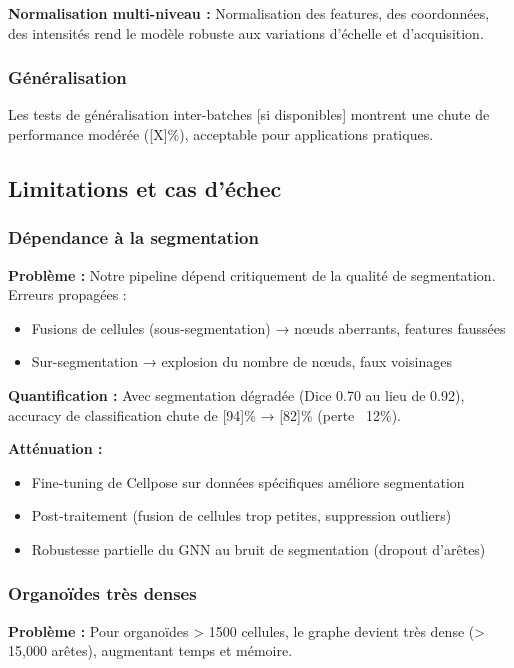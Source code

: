 \textbf{Normalisation multi-niveau :}
Normalisation des features, des coordonnées, des intensités rend le modèle robuste aux variations d'échelle et d'acquisition.

\subsubsection{Généralisation}

Les tests de généralisation inter-batches [si disponibles] montrent une chute de performance modérée ([X]\%), acceptable pour applications pratiques.

\subsection{Limitations et cas d'échec}

\subsubsection{Dépendance à la segmentation}

\textbf{Problème :}
Notre pipeline dépend critiquement de la qualité de segmentation. Erreurs propagées :
\begin{itemize}
    \item Fusions de cellules (sous-segmentation) → nœuds aberrants, features faussées
    \item Sur-segmentation → explosion du nombre de nœuds, faux voisinages
\end{itemize}

\textbf{Quantification :}
Avec segmentation dégradée (Dice 0.70 au lieu de 0.92), accuracy de classification chute de [94]\% → [82]\% (perte ~12\%).

\textbf{Atténuation :}
\begin{itemize}
    \item Fine-tuning de Cellpose sur données spécifiques améliore segmentation
    \item Post-traitement (fusion de cellules trop petites, suppression outliers)
    \item Robustesse partielle du GNN au bruit de segmentation (dropout d'arêtes)
\end{itemize}

\subsubsection{Organoïdes très denses}

\textbf{Problème :}
Pour organoïdes > 1500 cellules, le graphe devient très dense (> 15,000 arêtes), augmentant temps et mémoire.

